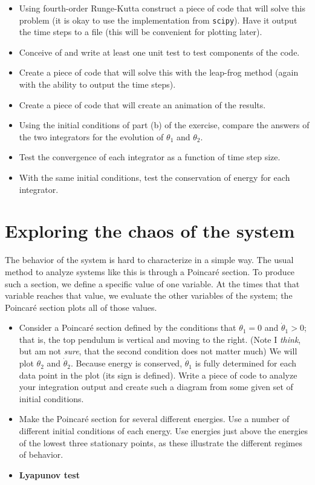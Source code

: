 \documentclass[11pt, preprint]{aastex}
\begin{document}
\begin{itemize}
\item Using fourth-order Runge-Kutta construct a piece of code that
  will solve this problem (it is okay to use the implementation from
  {\tt scipy}). Have it output the time steps to a file (this will be
  convenient for plotting later).
\item Conceive of and write at least one unit test to test components
  of the code.
\item Create a piece of code that will solve this with the leap-frog
  method (again with the ability to output the time steps).
\item Create a piece of code that will create an animation of the
  results.
\item Using the initial conditions of part (b) of the exercise,
  compare the answers of the two integrators for the evolution of
  $\theta_1$ and $\theta_2$.
\item Test the convergence of each integrator as a function of time
  step size.
\item With the same initial conditions, test the conservation of
  energy for each integrator.
\end{itemize}

\section{Exploring the chaos of the system}

The behavior of the system is hard to characterize in a simple
way. The usual method to analyze systems like this is through a
Poincar{\'e} section. To produce such a section, we define a specific
value of one variable. At the times that that variable reaches that
value, we evaluate the other variables of the system; the Poincar{\'e}
section plots all of those values.

\begin{itemize}
\item Consider a Poincar{\'e} section defined by the conditions that
  $\theta_1=0$ and $\dot\theta_1>0$; that is, the top pendulum is
  vertical and moving to the right.  (Note I {\it think}, but am not
  {\it sure}, that the second condition does not matter much) We will
  plot $\theta_2$ and $\dot\theta_2$. Because energy is conserved,
  $\dot\theta_1$ is fully determined for each data point in the plot
  (its sign is defined). Write a piece of code to analyze your
  integration output and create such a diagram from some given set of
  initial conditions.
 \item Make the Poincar{\'e} section for several different
   energies. Use a number of different initial conditions of each
   energy. Use energies just above the energies of the lowest three
   stationary points, as these illustrate the different regimes of
   behavior.
\item {\bf Lyapunov test}
\end{itemize}
\end{document}
